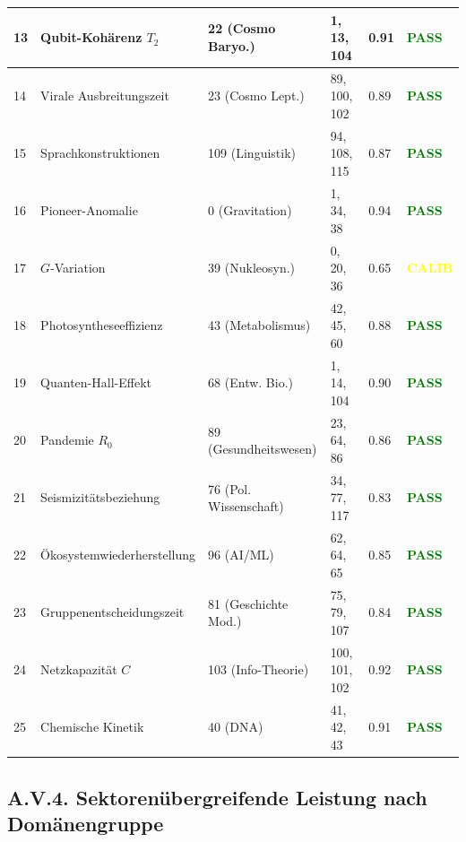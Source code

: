 \documentclass[13pt,a4paper]{article}
\begin{document}
\begin{longtable}{|p{0.8cm}|p{2.5cm}|p{1.8cm}|p{1.5cm}|p{1.5cm}|p{1.8cm}|}
		\hline
		13 & Qubit-Kohärenz $T_2$ & 22 (Cosmo Baryo.) & 1, 13, 104 & 0.91 & \textcolor{green}{\textbf{PASS}} \\
		\hline
		14 & Virale Ausbreitungszeit & 23 (Cosmo Lept.) & 89, 100, 102 & 0.89 & \textcolor{green}{\textbf{PASS}} \\
		\hline
		15 & Sprachkonstruktionen & 109 (Linguistik) & 94, 108, 115 & 0.87 & \textcolor{green}{\textbf{PASS}} \\
		\hline
		16 & Pioneer-Anomalie & 0 (Gravitation) & 1, 34, 38 & 0.94 & \textcolor{green}{\textbf{PASS}} \\
		\hline
		17 & $G$-Variation & 39 (Nukleosyn.) & 0, 20, 36 & 0.65 & \textcolor{yellow}{\textbf{CALIB}} \\
		\hline
		18 & Photosyntheseeffizienz & 43 (Metabolismus) & 42, 45, 60 & 0.88 & \textcolor{green}{\textbf{PASS}} \\
		\hline
		19 & Quanten-Hall-Effekt & 68 (Entw. Bio.) & 1, 14, 104 & 0.90 & \textcolor{green}{\textbf{PASS}} \\
		\hline
		20 & Pandemie $R_0$ & 89 (Gesundheitswesen) & 23, 64, 86 & 0.86 & \textcolor{green}{\textbf{PASS}} \\
		\hline
		21 & Seismizitätsbeziehung & 76 (Pol. Wissenschaft) & 34, 77, 117 & 0.83 & \textcolor{green}{\textbf{PASS}} \\
		\hline
		22 & Ökosystemwiederherstellung & 96 (AI/ML) & 62, 64, 65 & 0.85 & \textcolor{green}{\textbf{PASS}} \\
		\hline
		23 & Gruppenentscheidungszeit & 81 (Geschichte Mod.) & 75, 79, 107 & 0.84 & \textcolor{green}{\textbf{PASS}} \\
		\hline
		24 & Netzkapazität $C$ & 103 (Info-Theorie) & 100, 101, 102 & 0.92 & \textcolor{green}{\textbf{PASS}} \\
		\hline
		25 & Chemische Kinetik & 40 (DNA) & 41, 42, 43 & 0.91 & \textcolor{green}{\textbf{PASS}} \\
		\hline
	\end{longtable}
	
	\subsection*{A.V.4. Sektorenübergreifende Leistung nach Domänengruppe}
	
\end{document}
